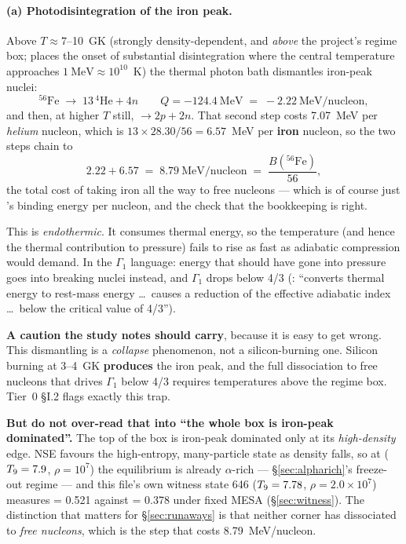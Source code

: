 \paragraph{(a) Photodisintegration of the iron peak.} Above $T \approx 7$--10~GK
(strongly density-dependent, and \emph{above} the project's regime box;
\citealt{janka2017} places the onset of substantial disintegration where the
central temperature approaches $1~\mathrm{MeV} \approx 10^{10}$~K) the thermal
photon bath dismantles iron-peak nuclei:
%
\begin{equation}
{}^{56}\mathrm{Fe} \;\to\; 13\,{}^{4}\mathrm{He} + 4n
\qquad Q = -124.4\ \mathrm{MeV} \;=\; -2.22\ \mathrm{MeV/nucleon},
\label{eq:fe56photo}
\end{equation}
%
and then, at higher $T$ still,  $\to 2p + 2n$. That second step
costs 7.07~MeV per \emph{helium} nucleon, which is $13 \times 28.30/56 = 6.57$~MeV
per \textbf{iron} nucleon, so the two steps chain to
%
\begin{equation}
2.22 + 6.57 \;=\; 8.79\ \mathrm{MeV/nucleon}
\;=\; \frac{B({}^{56}\mathrm{Fe})}{56},
\label{eq:dissbudget}
\end{equation}
%
the total cost of taking iron all the way to free nucleons --- which is of
course just 's binding energy per nucleon, and the check that the
bookkeeping is right. \derivedhere[from AME2020 \citep{wang2021} binding energies:
$B(\nuc{Fe}{56}) = 492.26$~MeV, $B(\nuc{He}{4}) = 28.30$~MeV]

This is \emph{endothermic}. It consumes thermal energy, so the temperature (and
hence the thermal contribution to pressure) fails to rise as fast as adiabatic
compression would demand. In the $\Gamma_1$ language: energy that should have
gone into pressure goes into breaking nuclei instead, and $\Gamma_1$ drops
below 4/3 (\citealt{janka2017}: ``converts thermal energy to rest-mass energy
\ldots\ causes a reduction of the effective adiabatic index \ldots\ below the
critical value of 4/3'').

\begin{warn}
\textbf{A caution the study notes should carry}, because it is easy to get
wrong. This dismantling is a \emph{collapse} phenomenon, not a silicon-burning
one. Silicon burning at 3--4~GK \textbf{produces} the iron peak, and the full
dissociation to free nucleons that drives $\Gamma_1$ below 4/3 requires
temperatures above the regime box. Tier~0 \S I.2 flags exactly this trap.

\textbf{But do not over-read that into ``the whole box is iron-peak
dominated''.} The top of the box is iron-peak dominated only at its
\emph{high-density} edge. NSE favours the high-entropy, many-particle state as
density falls, so at ($T_{9} = 7.9$, $\rho = 10^7$) the equilibrium is already
$\alpha$-rich --- \S\ref{sec:alpharich}'s freeze-out regime --- and this file's
own witness state 646 ($T_{9} = 7.78$, $\rho = 2.0 \times 10^7$) measures
 = 0.521 against  = 0.378 under fixed MESA
(\S\ref{sec:witness}). The distinction that matters for \S\ref{sec:runaways} is
that neither corner has dissociated to \emph{free nucleons}, which is the step
that costs 8.79~MeV/nucleon.
\end{warn}

